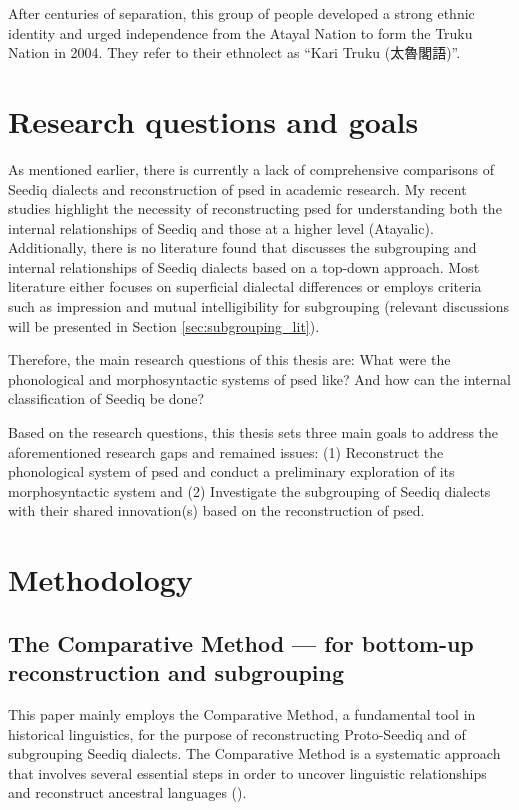 After centuries of separation, this group of people developed a strong ethnic identity and urged independence from the Atayal Nation to form the Truku Nation in 2004. They refer to their ethnolect as ``Kari Truku (太魯閣語)''.

\section{Research questions and goals}

As mentioned earlier, there is currently a lack of comprehensive comparisons of Seediq dialects and reconstruction of \acl{psed} in academic research. My recent studies highlight the necessity of reconstructing \acl{psed} for understanding both the internal relationships of Seediq and those at a higher level (Atayalic). Additionally, there is no literature found that discusses the subgrouping and internal relationships of Seediq dialects based on a top-down approach. Most literature either focuses on superficial dialectal differences or employs criteria such as impression and mutual intelligibility for subgrouping (relevant discussions will be presented in Section \ref{sec:subgrouping_lit}). 

Therefore, the main research questions of this thesis are: What were the phonological and morphosyntactic systems of \acl{psed} like? And how can the internal classification of Seediq be done?

Based on the research questions, this thesis sets three main goals to address the aforementioned research gaps and remained issues: (1) Reconstruct the phonological system of \acl{psed} and conduct a preliminary exploration of its morphosyntactic system and (2) Investigate the subgrouping of Seediq dialects with their shared innovation(s) based on the reconstruction of \acl{psed}.


\section{Methodology}\label{sec:methodology}

\subsection{The Comparative Method --- for bottom-up reconstruction and subgrouping}

This paper mainly employs the Comparative Method, a fundamental tool in historical linguistics, for the purpose of reconstructing Proto-Seediq and of subgrouping Seediq dialects. The Comparative Method is a systematic approach that involves several essential steps in order to uncover linguistic relationships and reconstruct ancestral languages (\cite{fox1995linguistic}).


